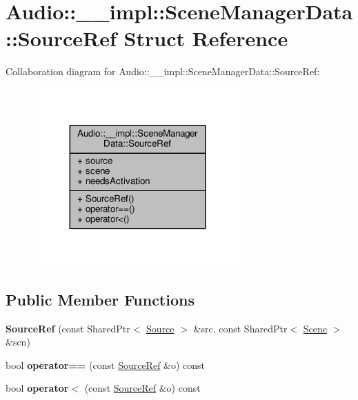 \hypertarget{structAudio_1_1____impl_1_1SceneManagerData_1_1SourceRef}{}\section{Audio\+:\+:\+\_\+\+\_\+impl\+:\+:Scene\+Manager\+Data\+:\+:Source\+Ref Struct Reference}
\label{structAudio_1_1____impl_1_1SceneManagerData_1_1SourceRef}


Collaboration diagram for Audio\+:\+:\+\_\+\+\_\+impl\+:\+:Scene\+Manager\+Data\+:\+:Source\+Ref\+:
\nopagebreak
\begin{figure}[H]
\begin{center}
\leavevmode
\includegraphics[width=227pt]{d5/d69/structAudio_1_1____impl_1_1SceneManagerData_1_1SourceRef__coll__graph}
\end{center}
\end{figure}
\subsection*{Public Member Functions}
\begin{DoxyCompactItemize}
\item 
{\bfseries Source\+Ref} (const Shared\+Ptr$<$ \hyperlink{classAudio_1_1Source}{Source} $>$ \&src, const Shared\+Ptr$<$ \hyperlink{classAudio_1_1Scene}{Scene} $>$ \&scn)\hypertarget{structAudio_1_1____impl_1_1SceneManagerData_1_1SourceRef_a0ebd121abaf22e6f9745d30858329827}{}\label{structAudio_1_1____impl_1_1SceneManagerData_1_1SourceRef_a0ebd121abaf22e6f9745d30858329827}

\item 
bool {\bfseries operator==} (const \hyperlink{structAudio_1_1____impl_1_1SceneManagerData_1_1SourceRef}{Source\+Ref} \&o) const \hypertarget{structAudio_1_1____impl_1_1SceneManagerData_1_1SourceRef_a0fdd6ee05b00364c10f9a61854142058}{}\label{structAudio_1_1____impl_1_1SceneManagerData_1_1SourceRef_a0fdd6ee05b00364c10f9a61854142058}

\item 
bool {\bfseries operator$<$} (const \hyperlink{structAudio_1_1____impl_1_1SceneManagerData_1_1SourceRef}{Source\+Ref} \&o) const \hypertarget{structAudio_1_1____impl_1_1SceneManagerData_1_1SourceRef_a8670881f01c79ae55a148f2adebd1080}{}\label{structAudio_1_1____impl_1_1SceneManagerData_1_1SourceRef_a8670881f01c79ae55a148f2adebd1080}

\end{DoxyCompactItemize}
